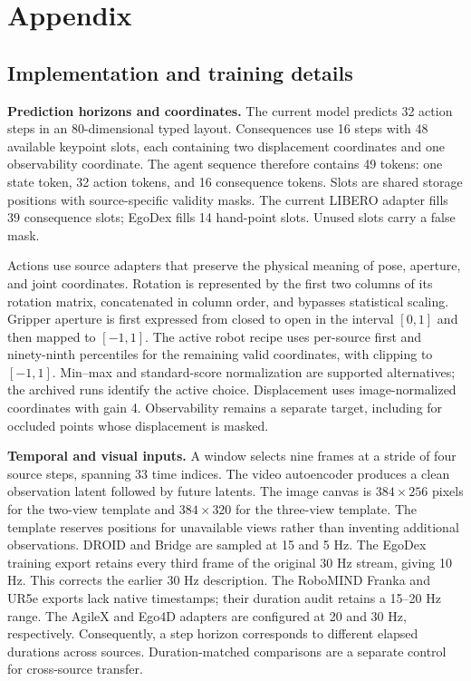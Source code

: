 \section*{Appendix}
\renewcommand{\thesubsection}{\Alph{subsection}}\setcounter{subsection}{0}

\subsection{Implementation and training details}
\label{app:details}
\textbf{Prediction horizons and coordinates.}
The current model predicts 32 action steps in an 80-dimensional typed layout. Consequences use 16
steps with 48 available keypoint slots, each containing two displacement coordinates and one
observability coordinate. The agent sequence therefore contains 49 tokens: one state token, 32
action tokens, and 16 consequence tokens. Slots are shared storage positions with source-specific
validity masks. The current LIBERO adapter fills 39 consequence slots; EgoDex fills 14 hand-point
slots. Unused slots carry a false mask.

Actions use source adapters that preserve the physical meaning of pose, aperture, and joint
coordinates. Rotation is represented by the first two columns of its rotation matrix, concatenated
in column order, and bypasses statistical scaling. Gripper aperture is first expressed from closed
to open in the interval $[0,1]$ and then mapped to $[-1,1]$. The active robot recipe uses per-source
first and ninety-ninth percentiles for the remaining valid coordinates, with clipping to $[-1,1]$.
Min--max and standard-score normalization are supported alternatives; the archived runs identify the
active choice. Displacement uses image-normalized coordinates with gain 4. Observability remains a
separate target, including for occluded points whose displacement is masked.

\textbf{Temporal and visual inputs.}
A window selects nine frames at a stride of four source steps, spanning 33 time indices. The video
autoencoder produces a clean observation latent followed by future latents. The image canvas is
$384\times256$ pixels for the two-view template and $384\times320$ for the three-view template. The
template reserves positions for unavailable views rather than inventing additional observations.
DROID and Bridge are sampled at 15 and 5 Hz. The EgoDex training export retains every third
frame of the original 30 Hz stream, giving 10 Hz. This corrects the earlier 30 Hz description.
The RoboMIND Franka and UR5e exports lack native timestamps; their duration audit retains
a 15--20 Hz range. The AgileX and Ego4D adapters are configured at 20 and 30 Hz, respectively.
Consequently, a step horizon corresponds to different elapsed durations across sources.
Duration-matched comparisons are a separate control for cross-source transfer.

